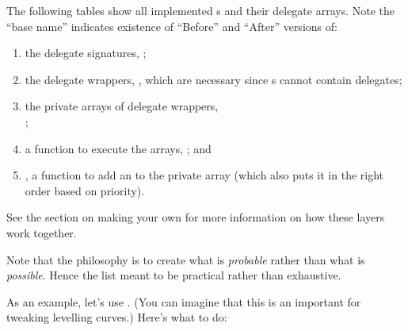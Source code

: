 





The following tables show all implemented s and their delegate arrays. Note the ``base name'' indicates existence of ``Before'' and ``After'' versions of:

\begin{enumerate}
	\item{the delegate signatures, ;}
	\item{the delegate wrappers, , which are necessary since s cannot contain delegates;}
	\item{the private arrays of delegate wrappers,\\ ;}
	\item{a function to execute the arrays, ; and}
	\item{, a function to add an  to the private array  (which also puts it in the right order based on priority).}
\end{enumerate}
See the section on making your own  for more information on how these layers work together.

Note that the philosophy is to create what is \textit{probable} rather than what is \textit{possible}. Hence the list meant to be practical rather than exhaustive.






As an example, let's use . (You can imagine that this is an important  for tweaking levelling curves.) Here's what to do:\\

